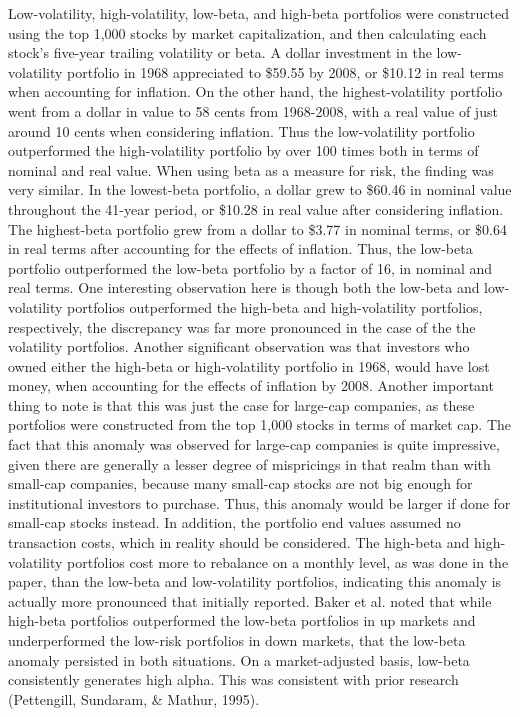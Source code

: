 \documentclass[12pt,twoside]{reedthesis}
\theoremstyle{definition}
\theoremstyle{definition}
\theoremstyle{definition}
\theoremstyle{remark}
\begin{document}
Low-volatility, high-volatility, low-beta, and high-beta portfolios were
constructed using the top 1,000 stocks by market capitalization, and
then calculating each stock's five-year trailing volatility or beta. A
dollar investment in the low-volatility portfolio in 1968 appreciated to
\$59.55 by 2008, or \$10.12 in real terms when accounting for inflation.
On the other hand, the highest-volatility portfolio went from a dollar
in value to 58 cents from 1968-2008, with a real value of just around 10
cents when considering inflation. Thus the low-volatility portfolio
outperformed the high-volatility portfolio by over 100 times both in
terms of nominal and real value. When using beta as a measure for risk,
the finding was very similar. In the lowest-beta portfolio, a dollar
grew to \$60.46 in nominal value throughout the 41-year period, or
\$10.28 in real value after considering inflation. The highest-beta
portfolio grew from a dollar to \$3.77 in nominal terms, or \$0.64 in
real terms after accounting for the effects of inflation. Thus, the
low-beta portfolio outperformed the low-beta portfolio by a factor of
16, in nominal and real terms. One interesting observation here is
though both the low-beta and low-volatility portfolios outperformed the
high-beta and high-volatility portfolios, respectively, the discrepancy
was far more pronounced in the case of the the volatility portfolios.
Another significant observation was that investors who owned either the
high-beta or high-volatility portfolio in 1968, would have lost money,
when accounting for the effects of inflation by 2008. Another important
thing to note is that this was just the case for large-cap companies, as
these portfolios were constructed from the top 1,000 stocks in terms of
market cap. The fact that this anomaly was observed for large-cap
companies is quite impressive, given there are generally a lesser degree
of mispricings in that realm than with small-cap companies, because many
small-cap stocks are not big enough for institutional investors to
purchase. Thus, this anomaly would be larger if done for small-cap
stocks instead. In addition, the portfolio end values assumed no
transaction costs, which in reality should be considered. The high-beta
and high-volatility portfolios cost more to rebalance on a monthly
level, as was done in the paper, than the low-beta and low-volatility
portfolios, indicating this anomaly is actually more pronounced that
initially reported. Baker et al. noted that while high-beta portfolios
outperformed the low-beta portfolios in up markets and underperformed
the low-risk portfolios in down markets, that the low-beta anomaly
persisted in both situations. On a market-adjusted basis, low-beta
consistently generates high alpha. This was consistent with prior
research (Pettengill, Sundaram, \& Mathur, 1995).
\end{document}
